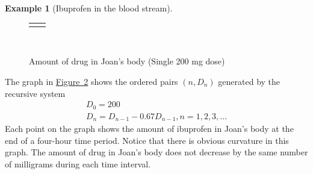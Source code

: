 \documentclass[10pt,]{book}
\theoremstyle{plain}
\theoremstyle{definition}
\theoremstyle{definition}
\newtheorem{example}[theorem]{Example}
\theoremstyle{definition}
\numberwithin{equation}{section}
\newlength{\panelmax}
\begin{document}
\begin{example}[Ibuprofen in the blood stream]
\begin{figure}
{\ifdefined\phBimage\else\newlength{\phBimage}\fi%
\setlength{\phBimage}{\ht\panelboxBimage+\dp\panelboxBimage}
\settototalheight{\phBimage}{\usebox{\panelboxBimage}}
\setlength{\panelmax}{\maxof{\panelmax}{\phBimage}}
\leavevmode%
\setlength{\tabcolsep}{0.0375\linewidth}
\par\medskip\noindent
\hspace*{0.0375\linewidth}%
\begin{tabular}{@{}*{2}{c}@{}}
\begin{minipage}[c][\panelmax][t]{0.2\linewidth}\usebox{\panelboxAimage}\end{minipage}&
\begin{minipage}[c][\panelmax][t]{0.65\linewidth}\usebox{\panelboxBimage}\end{minipage}\end{tabular}\\
}%
\caption{Amount of drug in Joan's body (Single 200 mg dose)\label{figure-ibuprofen-one-dose}}
\end{figure}
\hypertarget{p-12}{}%
The graph in \hyperref[figure-ibuprofen-one-dose]{Figure~2} shows the ordered pairs \((n,D_n)\) generated by the recursive system%
%
\begin{gather*}
D_0=200\\
D_n=D_{n-1} - 0.67D_{n-1}, n=1,2,3,...
\end{gather*}
\hypertarget{p-13}{}%
Each point on the graph shows the amount of ibuprofen in Joan’s body at the end of a four-hour time period. Notice that there is obvious curvature in this graph.  The amount of drug in Joan’s body does not decrease by the same number of milligrams during each time interval.%
\end{example}
\typeout{************************************************}
\typeout{************************************************}
\end{document}
